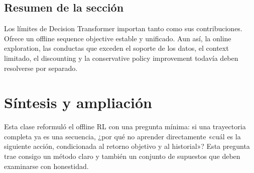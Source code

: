 \documentclass[a4paper]{article}
\begin{document}
\subsection{Resumen de la sección}

Los límites de Decision Transformer importan tanto como sus contribuciones. Ofrece un offline sequence objective estable y unificado. Aun así, la online exploration, las conductas que exceden el soporte de los datos, el context limitado, el discounting y la conservative policy improvement todavía deben resolverse por separado.
\section{Síntesis y ampliación}

Esta clase reformuló el offline RL con una pregunta mínima: si una trayectoria completa ya es una secuencia, ¿por qué no aprender directamente «cuál es la siguiente acción, condicionada al retorno objetivo y al historial»? Esta pregunta trae consigo un método claro y también un conjunto de supuestos que deben examinarse con honestidad.
\end{document}
